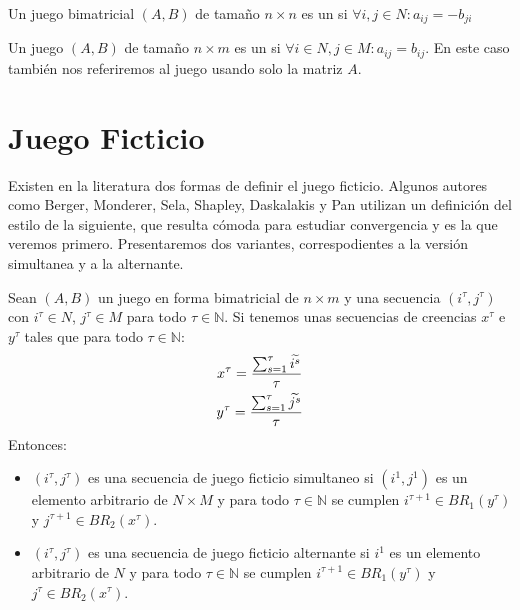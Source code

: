 \begin{definition}
    Un juego bimatricial $(A, B)$ de tamaño $n \times n$ es un  si $\forall i, j \in N : a_{ij} = -b_{ji}$
\end{definition}

\begin{definition}
    Un juego $(A, B)$ de tamaño $n \times m$ es un  si $\forall i \in N, j \in M : a_{ij} = b_{ij}$. En este caso también nos referiremos al juego usando solo la matriz $A$.
\end{definition}


\section{Juego Ficticio} \label{sec:def:fp}


Existen en la literatura dos formas de definir el juego ficticio. Algunos autores como Berger, Monderer, Sela, Shapley, Daskalakis y Pan \cite{browns:original} \cite{no:cycling} \cite{2x2:without} \cite{identical:interests} \cite{counter:karlin:strong} utilizan un definición del estilo de la siguiente, que resulta cómoda para estudiar convergencia y es la que veremos primero. Presentaremos dos variantes, correspodientes a la versión simultanea y a la alternante.


\begin{definition} \label{def:fp:berger}
    Sean $(A, B)$ un juego en forma bimatricial de $n \times m$ y una secuencia $(i^\tau, j^\tau)$ con $i^\tau \in N$, $j^\tau \in M$ para todo $\tau \in \mathbb{N}$. Si tenemos unas secuencias de creencias $x^\tau$ e $y^\tau$ tales que para todo $\tau \in \mathbb{N}$:
    \begin{gather*}
        x^\tau= \frac{\sum^\tau_{s=1} \widetilde{i^s}}{\tau}  \\
        y^\tau= \frac{\sum^\tau_{s=1} \widetilde{j^s}}{\tau}
    \end{gather*}
    Entonces:
    \begin{itemize}
        \item $(i^\tau, j^\tau)$ es una secuencia de juego ficticio simultaneo si $(i^1, j^1)$ es un elemento arbitrario de $N \times M$ y para todo $\tau \in \mathbb{N}$ se cumplen $i^{\tau+1} \in BR_1(y^\tau)$ y $j^{\tau+1} \in BR_2(x^\tau)$.
        \item $(i^\tau, j^\tau)$ es una secuencia de juego ficticio alternante si $i^1$ es un elemento arbitrario de $N$ y para todo $\tau \in \mathbb{N}$ se cumplen $i^{\tau+1} \in BR_1(y^\tau)$ y $j^{\tau} \in BR_2(x^\tau)$.
    \end{itemize}
\end{definition}

